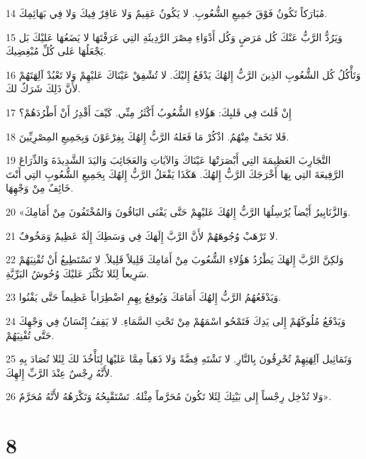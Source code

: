 \par 14 مُبَارَكاً تَكُونُ فَوْقَ جَمِيعِ الشُّعُوبِ. لا يَكُونُ عَقِيمٌ وَلا عَاقِرٌ فِيكَ وَلا فِي بَهَائِمِكَ.
\par 15 وَيَرُدُّ الرَّبُّ عَنْكَ كُل مَرَضٍ وَكُل أَدْوَاءِ مِصْرَ الرَّدِيئَةِ التِي عَرَفْتَهَا لا يَضَعُهَا عَليْكَ بَل يَجْعَلُهَا عَلى كُلِّ مُبْغِضِيكَ.
\par 16 وَتَأْكُلُ كُل الشُّعُوبِ الذِينَ الرَّبُّ إِلهُكَ يَدْفَعُ إِليْكَ. لا تُشْفِقْ عَيْنَاكَ عَليْهِمْ وَلا تَعْبُدْ آلِهَتَهُمْ لأَنَّ ذَلِكَ شَرَكٌ لكَ.
\par 17 إِنْ قُلتَ فِي قَلبِكَ: هَؤُلاءِ الشُّعُوبُ أَكْثَرُ مِنِّي. كَيْفَ أَقْدِرُ أَنْ أَطْرُدَهُمْ؟
\par 18 فَلا تَخَفْ مِنْهُمُ. اذْكُرْ مَا فَعَلهُ الرَّبُّ إِلهُكَ بِفِرْعَوْنَ وَبِجَمِيعِ المِصْرِيِّينَ.
\par 19 التَّجَارِبَ العَظِيمَةَ التِي أَبْصَرَتْهَا عَيْنَاكَ وَالآيَاتِ وَالعَجَائِبَ وَاليَدَ الشَّدِيدَةَ وَالذِّرَاعَ الرَّفِيعَةَ التِي بِهَا أَخْرَجَكَ الرَّبُّ إِلهُكَ. هَكَذَا يَفْعَلُ الرَّبُّ إِلهُكَ بِجَمِيعِ الشُّعُوبِ التِي أَنْتَ خَائِفٌ مِنْ وَجْهِهَا.
\par 20 «وَالزَّنَابِيرُ أَيْضاً يُرْسِلُهَا الرَّبُّ إِلهُكَ عَليْهِمْ حَتَّى يَفْنَى البَاقُونَ وَالمُخْتَفُونَ مِنْ أَمَامِكَ.
\par 21 لا تَرْهَبْ وُجُوهَهُمْ لأَنَّ الرَّبَّ إِلَهَكَ فِي وَسَطِكَ إِلَهٌ عَظِيمٌ وَمَخُوفٌ.
\par 22 وَلكِنَّ الرَّبَّ إِلهَكَ يَطْرُدُ هَؤُلاءِ الشُّعُوبَ مِنْ أَمَامِكَ قَلِيلاً قَلِيلاً. لا تَسْتَطِيعُ أَنْ تُفْنِيَهُمْ سَرِيعاً لِئَلا تَكْثُرَ عَليْكَ وُحُوشُ البَرِّيَّةِ.
\par 23 وَيَدْفَعُهُمُ الرَّبُّ إِلهُكَ أَمَامَكَ وَيُوقِعُ بِهِمِ اضْطِرَاباً عَظِيماً حَتَّى يَفْنُوا.
\par 24 وَيَدْفَعُ مُلُوكَهُمْ إِلى يَدِكَ فَتَمْحُو اسْمَهُمْ مِنْ تَحْتِ السَّمَاءِ. لا يَقِفُ إِنْسَانٌ فِي وَجْهِكَ حَتَّى تُفْنِيَهُمْ.
\par 25 وَتَمَاثِيل آلِهَتِهِمْ تُحْرِقُونَ بِالنَّارِ. لا تَشْتَهِ فِضَّةً وَلا ذَهَباً مِمَّا عَليْهَا لِتَأْخُذَ لكَ لِئَلا تُصَادَ بِهِ لأَنَّهُ رِجْسٌ عِنْدَ الرَّبِّ إِلهِكَ.
\par 26 وَلا تُدْخِل رِجْساً إِلى بَيْتِكَ لِئَلا تَكُونَ مُحَرَّماً مِثْلهُ. تَسْتَقْبِحُهُ وَتَكْرَهُهُ لأَنَّهُ مُحَرَّمٌ».

\chapter{8}

